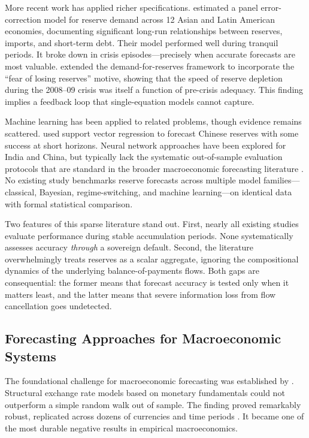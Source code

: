 \documentclass[12pt,a4paper]{article}
\begin{document}
More recent work has applied richer specifications. \cite{Gosselin2005} estimated a panel error-correction model for reserve demand across 12 Asian and Latin American economies, documenting significant long-run relationships between reserves, imports, and short-term debt. Their model performed well during tranquil periods. It broke down in crisis episodes---precisely when accurate forecasts are most valuable. \cite{Aizenman2012} extended the demand-for-reserves framework to incorporate the ``fear of losing reserves'' motive, showing that the speed of reserve depletion during the 2008--09 crisis was itself a function of pre-crisis adequacy. This finding implies a feedback loop that single-equation models cannot capture.

Machine learning has been applied to related problems, though evidence remains scattered. \cite{Yu2007} used support vector regression to forecast Chinese reserves with some success at short horizons. Neural network approaches have been explored for India and China, but typically lack the systematic out-of-sample evaluation protocols that are standard in the broader macroeconomic forecasting literature \citep{Rossi2013}. No existing study benchmarks reserve forecasts across multiple model families---classical, Bayesian, regime-switching, and machine learning---on identical data with formal statistical comparison.

Two features of this sparse literature stand out. First, nearly all existing studies evaluate performance during stable accumulation periods. None systematically assesses accuracy \textit{through} a sovereign default. Second, the literature overwhelmingly treats reserves as a scalar aggregate, ignoring the compositional dynamics of the underlying balance-of-payments flows. Both gaps are consequential: the former means that forecast accuracy is tested only when it matters least, and the latter means that severe information loss from flow cancellation goes undetected.

\subsection{Forecasting Approaches for Macroeconomic Systems}

The foundational challenge for macroeconomic forecasting was established by \cite{MeeseRogoff1983}. Structural exchange rate models based on monetary fundamentals could not outperform a simple random walk out of sample. The finding proved remarkably robust, replicated across dozens of currencies and time periods \citep{Rossi2013,CheungChinnPascual2005}. It became one of the most durable negative results in empirical macroeconomics.
\end{document}
